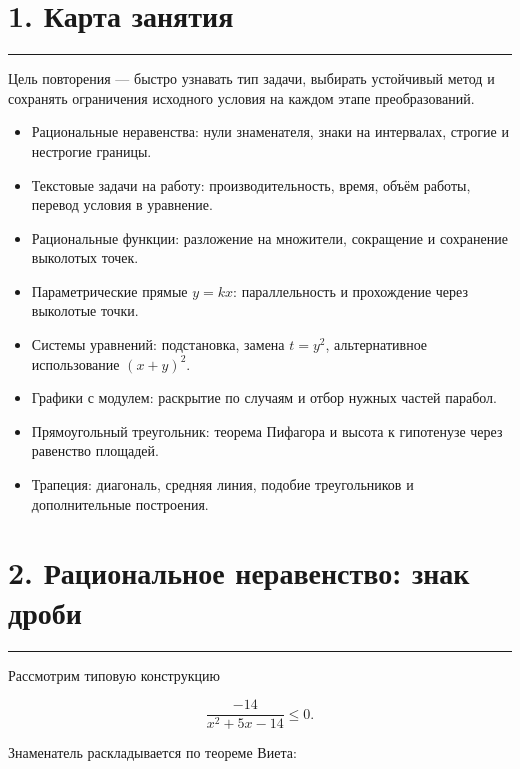 \documentclass[a4paper,12pt]{article}
\newcommand{\topicline}{
    \textcolor{accent}{\rule{\linewidth}{0.6pt}}
}
\newcommand{\checkitem}[1]{
    \item[$\square$] #1
}
\begin{document}
\section*{1. Карта занятия}
\topicline

Цель повторения --- быстро узнавать тип задачи, выбирать устойчивый
метод и сохранять ограничения исходного условия на каждом этапе
преобразований.

\begin{itemize}
    \checkitem{
        Рациональные неравенства:
        нули знаменателя, знаки на интервалах,
        строгие и нестрогие границы.
    }

    \checkitem{
        Текстовые задачи на работу:
        производительность, время, объём работы,
        перевод условия в уравнение.
    }

    \checkitem{
        Рациональные функции:
        разложение на множители,
        сокращение и сохранение выколотых точек.
    }

    \checkitem{
        Параметрические прямые $y=kx$:
        параллельность и прохождение
        через выколотые точки.
    }

    \checkitem{
        Системы уравнений:
        подстановка, замена $t=y^2$,
        альтернативное использование $(x+y)^2$.
    }

    \checkitem{
        Графики с модулем:
        раскрытие по случаям
        и отбор нужных частей парабол.
    }

    \checkitem{
        Прямоугольный треугольник:
        теорема Пифагора и высота к гипотенузе
        через равенство площадей.
    }

    \checkitem{
        Трапеция:
        диагональ, средняя линия,
        подобие треугольников
        и дополнительные построения.
    }
\end{itemize}


\section*{2. Рациональное неравенство: знак дроби}
\topicline

Рассмотрим типовую конструкцию

\[
\frac{-14}{x^2+5x-14}\le 0.
\]

Знаменатель раскладывается по теореме Виета:
\end{document}

